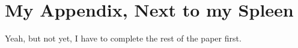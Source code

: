 
\chapter{My Appendix, Next to my Spleen}

Yeah, but not yet, I have to complete the rest of the paper first.